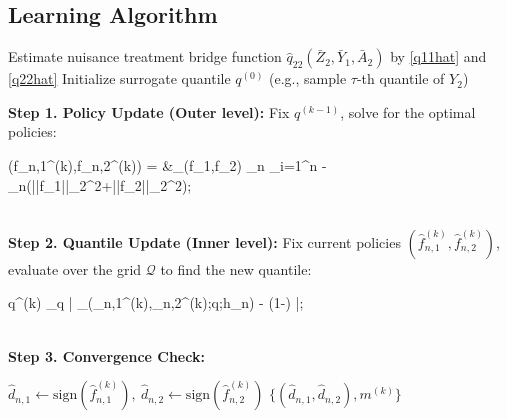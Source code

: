 \documentclass[10pt]{article}
\DeclareMathOperator*{\argmax}{arg\,max}
\DeclareMathOperator*{\argmin}{arg\,min}
\theoremstyle{remark} \newtheorem{rem}{Remark}
\begin{document}
\subsection{Learning Algorithm}
\begin{algorithm}[htb]
    \caption{Quantile-Optimal DTR Estimation via Alternating Optimization}

    
    \BlankLine
    Estimate nuisance treatment bridge function $\hat{q}_{22}(\bar Z_2,\bar Y_1, \bar A_2)$ by \eqref{q11hat} and \eqref{q22hat}\;
    Initialize surrogate quantile $q^{(0)}$ (e.g., sample $\tau$-th quantile of $Y_2$)\;
    {
        \textbf{Step 1. Policy Update (Outer level):} Fix $q^{(k-1)}$, solve for the optimal policies:
        \begin{flalign*}
            (\hat f_{n,1}^{(k)},\hat f_{n,2}^{(k)}) = &\argmax_{(f_1,f_2) \in {}_n} \sum_{i=1}^n   - \lambda_n(||f_1||_{2}^2+||f_2||_{2}^2);
        \end{flalign*} \\
        \textbf{Step 2. Quantile Update (Inner level):} Fix current policies $(\hat f_{n,1}^{(k)},\hat f_{n,2}^{(k)})$, evaluate over the grid $\mathcal{Q}$ to find the new quantile:
        \begin{flalign*}
            q^{(k)} \leftarrow \argmin_{q \in {}} \left| _{\Phi}(_{n,1}^{(k)},_{n,2}^{(k)};q;{h_n}) - (1-\tau) \right|;
        \end{flalign*}\\
        \textbf{Step 3. Convergence Check:} \\

        \BlankLine
    }
    $\hat{d}_{n,1} \leftarrow \text{sign}(\hat f_{n,1}^{(k)}), \: \hat{d}_{n,2} \leftarrow \text{sign}(\hat f_{n,2}^{(k)})$ \;
    \Return $\{(\hat{d}_{n,1},\hat{d}_{n,2}), m^{(k)}\}$\;
    \label{alg1}
\end{algorithm}
\end{document}
